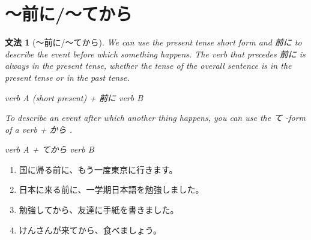 \documentclass[notoc,notitlepage]{tufte-book}
\newtheorem{grammar}{\faBook \enspace 文法}[section]
\begin{document}

\section{〜前に/〜てから}%
\label{sec:_qian_ni_tekara}

\begin{grammar}[〜前に/〜てから]
\label{grammar:_qian_ni_tekara}
  We can use the present tense short form and 前に to describe the event \textit{before} which something happens. The verb that precedes 前に is always in the present tense, whether the tense of the overall sentence is in the present tense or in the past tense.

  \begin{center}
    verb A (short present) + 前に verb B
  \end{center}

  To describe an event after which another thing happens, you can use the て -form of a verb + から .

  \begin{center}
    verb A + てから verb B
  \end{center}
\end{grammar}

\begin{eg}
  \begin{enumerate}
    \item 国に帰る前に、もう一度東京に行きます。
    \item 日本に来る前に、一学期日本語を勉強しました。
    \item 勉強してから、友達に手紙を書きました。
    \item けんさんが来てから、食べましょう。
  \end{enumerate}
\end{eg}
\end{document}
